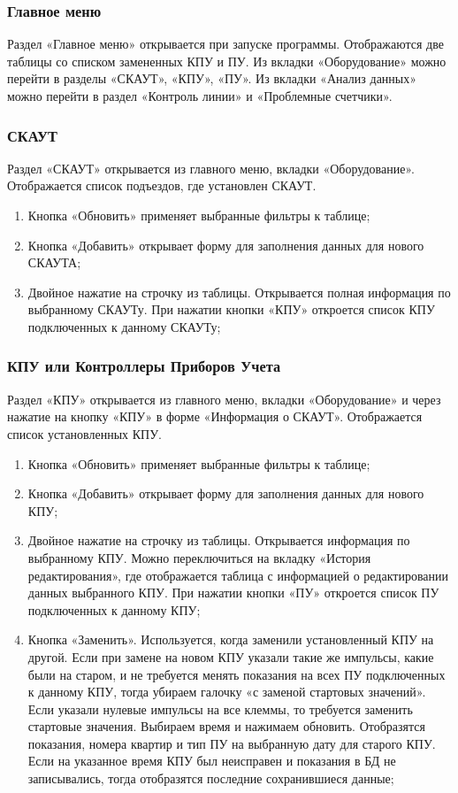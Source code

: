 \subsubsection{Главное меню}
Раздел «Главное меню» открывается при запуске программы. Отображаются две таблицы со списком замененных КПУ и ПУ. Из вкладки «Оборудование» можно перейти в разделы «СКАУТ», «КПУ», «ПУ». Из вкладки «Анализ данных» можно перейти в раздел «Контроль линии» и «Проблемные счетчики».

\subsubsection{СКАУТ}
Раздел «СКАУТ» открывается из главного меню, вкладки «Оборудование». Отображается список подъездов, где установлен СКАУТ. 
\begin{enumerate}
	\item Кнопка «Обновить» применяет выбранные фильтры к таблице;
	\item Кнопка «Добавить» открывает форму для заполнения данных для нового СКАУТА;
	\item Двойное нажатие на строчку из таблицы. Открывается полная информация по выбранному СКАУТу. При нажатии кнопки «КПУ» откроется список КПУ подключенных к данному СКАУТу;
\end{enumerate}

\subsubsection{КПУ или Контроллеры Приборов Учета}
Раздел «КПУ» открывается из главного меню, вкладки «Оборудование» и через нажатие на кнопку «КПУ» в форме «Информация о СКАУТ». Отображается список установленных КПУ.
\begin{enumerate}
	\item Кнопка «Обновить» применяет выбранные фильтры к таблице;
	\item Кнопка «Добавить» открывает форму для заполнения данных для нового КПУ;
	\item Двойное нажатие на строчку из таблицы. Открывается информация по выбранному КПУ. Можно переключиться на вкладку «История редактирования», где отображается таблица с информацией о редактировании данных выбранного КПУ. При нажатии кнопки «ПУ» откроется список ПУ подключенных к данному КПУ;
	\item Кнопка «Заменить». Используется, когда заменили установленный КПУ на другой. Если при замене на новом КПУ указали такие же импульсы, какие были на старом, и не требуется менять показания на всех ПУ подключенных к данному КПУ, тогда убираем галочку «с заменой стартовых значений». Если указали нулевые импульсы на все клеммы, то требуется заменить стартовые значения. Выбираем время и нажимаем обновить. Отобразятся показания, номера квартир и тип ПУ на выбранную дату для старого КПУ. Если на указанное время КПУ был неисправен и показания в БД не записывались, тогда отобразятся последние сохранившиеся данные;
\end{enumerate}	

